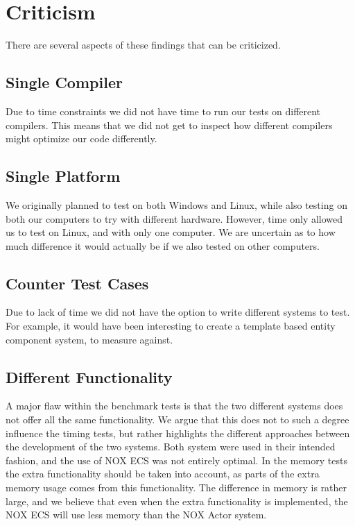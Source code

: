 \section{Criticism}
\label{sec:discussion_criticism}
There are several aspects of these findings that can be criticized.

\subsection{Single Compiler}
Due to time constraints we did not have time to run our tests on different compilers.
This means that we did not get to inspect how different compilers might optimize our code differently.

\subsection{Single Platform}
We originally planned to test on both Windows and Linux, while also testing on both our computers to
try with different hardware. However, time only allowed us to test on Linux, and with only one computer.
We are uncertain as to how much difference it would actually be if we also tested on other computers.

\subsection{Counter Test Cases}
Due to lack of time we did not have the option to write different systems to test.
For example, it would have been interesting to create a template based entity component system,
to measure against.

\subsection{Different Functionality}
A major flaw within the benchmark tests is that the two different systems does not offer all the same functionality.
We argue that this does not to such a degree influence the timing tests, but rather highlights the different approaches
between the development of the two systems.
Both system were used in their intended fashion, and the use of NOX ECS was not entirely optimal.
In the memory tests the extra functionality should be taken into account, as parts of the extra memory usage
comes from this functionality.
The difference in memory is rather large, and we believe that even when the extra functionality is implemented,
the NOX ECS will use less memory than the NOX Actor system.

